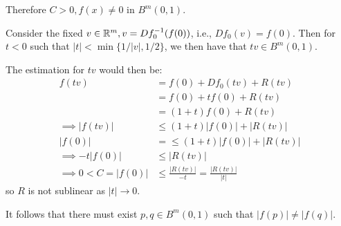 \documentclass[a4paper, 12pt]{article}
\begin{document}
\begin{solution}
    Therefore $C > 0, f(x) \neq 0$ in $B^m(0, 1)$.

    Consider the fixed $v \in \mathbb{R}^m, v = Df_0^{-1}(f(0))$, i.e., $Df_0(v) = f(0)$. Then for $t < 0$ such that $|t| < \min\{1/|v|, 1/2\}$, we then have that $tv \in B^m (0, 1)$.

    The estimation for $tv$ would then be:
    \begin{align*}
        f(tv)                   & = f(0) + Df_0(tv) + R(tv)                     \\
                                & = f(0) + tf(0) + R(tv)                        \\
                                & = (1+t) f(0) + R(tv)                          \\
        \implies |f(tv)|        & \leq (1+t)|f(0)| + |R(tv)|                    \\
        |f(0)|                  & = \leq (1+t)|f(0)| + |R(tv)|                  \\
        \implies -t|f(0)|       & \leq |R(tv)|                                  \\
        \implies 0 < C = |f(0)| & \leq \frac{|R(tv)|}{-t} = \frac{|R(tv)|}{|t|}
    \end{align*}
    so $R$ is not sublinear as $|t| \to 0$.

    It follows that there must exist $p, q \in B^m(0, 1)$ such that $|f(p)| \neq |f(q)|$.
\end{solution}
\end{document}
